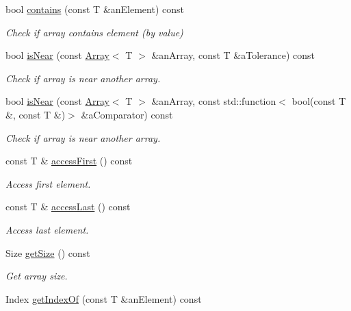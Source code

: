 \begin{DoxyCompactItemize}
bool \hyperlink{classostk_1_1core_1_1ctnr_1_1_array_a85fc440424ec33983e25238e9cbde67d}{contains} (const T \&an\+Element) const
\begin{DoxyCompactList}\small\item\em Check if array contains element (by value) \end{DoxyCompactList}\item 
bool \hyperlink{classostk_1_1core_1_1ctnr_1_1_array_a84e6c98f80b38dd59339eee9b8a97419}{is\+Near} (const \hyperlink{classostk_1_1core_1_1ctnr_1_1_array}{Array}$<$ T $>$ \&an\+Array, const T \&a\+Tolerance) const
\begin{DoxyCompactList}\small\item\em Check if array is near another array. \end{DoxyCompactList}\item 
bool \hyperlink{classostk_1_1core_1_1ctnr_1_1_array_a5d568e0bb551d55ff4d2ed9fbbe00c16}{is\+Near} (const \hyperlink{classostk_1_1core_1_1ctnr_1_1_array}{Array}$<$ T $>$ \&an\+Array, const std\+::function$<$ bool(const T \&, const T \&)$>$ \&a\+Comparator) const
\begin{DoxyCompactList}\small\item\em Check if array is near another array. \end{DoxyCompactList}\item 
const T \& \hyperlink{classostk_1_1core_1_1ctnr_1_1_array_ab8a576023f31f018a134831de36d5eb9}{access\+First} () const
\begin{DoxyCompactList}\small\item\em Access first element. \end{DoxyCompactList}\item 
const T \& \hyperlink{classostk_1_1core_1_1ctnr_1_1_array_a10ce6e99048cfd2fea96a934e2737604}{access\+Last} () const
\begin{DoxyCompactList}\small\item\em Access last element. \end{DoxyCompactList}\item 
Size \hyperlink{classostk_1_1core_1_1ctnr_1_1_array_a42e093c2f11de1c7a96ebd0ee6262c63}{get\+Size} () const
\begin{DoxyCompactList}\small\item\em Get array size. \end{DoxyCompactList}\item 
Index \hyperlink{classostk_1_1core_1_1ctnr_1_1_array_a15962a36fd2a4fc1e972a1b68ff7c170}{get\+Index\+Of} (const T \&an\+Element) const

\end{DoxyCompactItemize}
